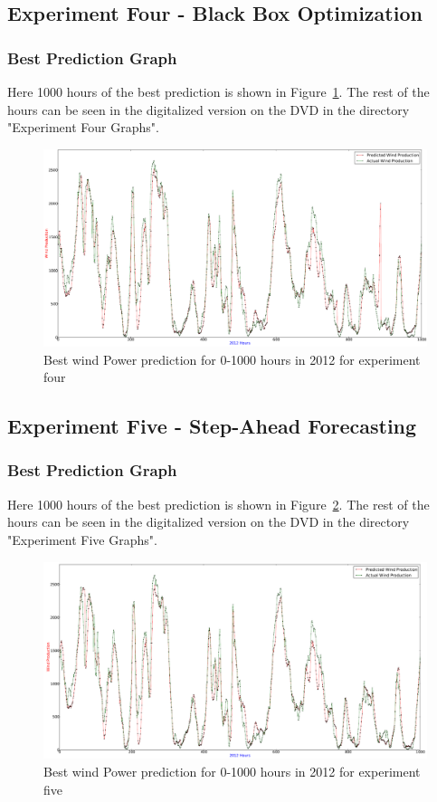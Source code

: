 \subsection{Experiment Four - Black Box Optimization}

\subsubsection{Best Prediction Graph}
Here 1000 hours of the best prediction is shown in Figure~\ref{fig:experimentFourInput}. The rest of the hours can be seen in the digitalized version on the DVD in the directory "Experiment Four Graphs".

\begin{figure}
\centering
\includegraphics[width=0.99\linewidth]{billeder/experimentFourInput.png}
\caption{Best wind Power prediction for 0-1000 hours in 2012 for experiment four}
\label{fig:experimentFourInput}
\end{figure} 

\subsection{Experiment Five - Step-Ahead Forecasting}

\subsubsection{Best Prediction Graph}
Here 1000 hours of the best prediction is shown in Figure~\ref{fig:experimentFiveInput}. The rest of the hours can be seen in the digitalized version on the DVD in the directory "Experiment Five Graphs".

\begin{figure}
\centering
\includegraphics[width=0.99\linewidth]{billeder/experimentFiveInput.png}
\caption{Best wind Power prediction for 0-1000 hours in 2012 for experiment five}
\label{fig:experimentFiveInput}
\end{figure} 